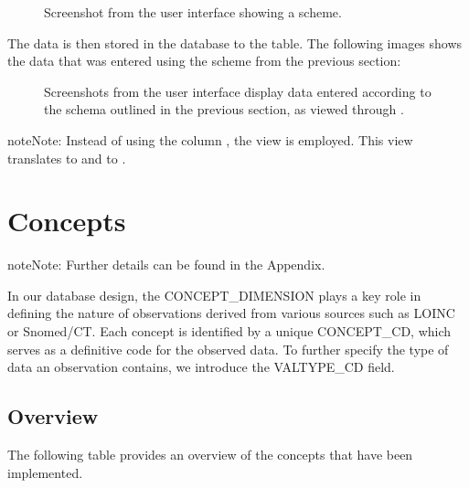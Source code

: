 \documentclass[a4paper,10pt,english]{sphinxmanual}
\begin{document}
\begin{figure}[htbp]
\centering
\capstart

\noindent{}
\caption{Screenshot from the user interface showing a scheme.}\label{\detokenize{TechnicalDetails:id7}}\end{figure}

\sphinxAtStartPar
The data is then stored in the database to the  table. The following images shows the data that was entered using the scheme from the previous section:

\begin{figure}[htbp]
\centering
\capstart

\noindent{}
\caption{Screenshots from the user interface display data entered according to the schema outlined in the previous section, as viewed through .}\label{\detokenize{TechnicalDetails:id8}}\end{figure}

\begin{sphinxadmonition}{note}{Note:}
\sphinxAtStartPar
Instead of using the column , the view  is employed. This view translates  to  and  to .
\end{sphinxadmonition}


\section{Concepts}
\label{\detokenize{TechnicalDetails:concepts}}
\begin{sphinxadmonition}{note}{Note:}
\sphinxAtStartPar
Further details can be found in the Appendix.
\end{sphinxadmonition}

\sphinxAtStartPar
In our database design, the CONCEPT\_DIMENSION plays a key role in defining the nature of observations derived from various sources such as LOINC or Snomed/CT. Each concept is identified by a unique CONCEPT\_CD, which serves as a definitive code for the observed data. To further specify the type of data an observation contains, we introduce the VALTYPE\_CD field.


\subsection{Overview}
\label{\detokenize{TechnicalDetails:id1}}
\sphinxAtStartPar
The following table provides an overview of the concepts that have been implemented.
\end{document}
